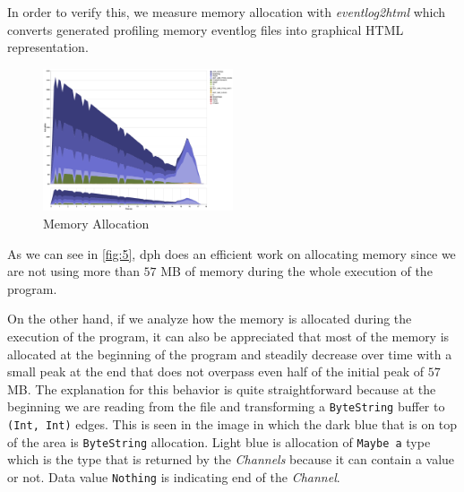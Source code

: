 \documentclass[preprint]{elsarticle}
\begin{document}
In order to verify this, we measure memory allocation with \textit{eventlog2html} \cite{eventlog2html} which converts generated profiling memory eventlog files into graphical HTML representation. 

\begin{figure}
  \begin{center}
     \includegraphics[width=0.5\textwidth] {visualization}
       \end{center}
     \caption{Memory Allocation}
     \label{fig:5}
 \end{figure}
 

As we can see in \autoref{fig:5}, \acrshort{dph} does an efficient work on allocating memory since we are not using more than $57$ MB of memory during the whole execution of the program.

On the other hand, if we analyze how the memory is allocated during the execution of the program, it can also be appreciated that most of the memory is allocated at the beginning of the program and steadily decrease over time with a small peak at the end that does not overpass even half of the initial peak of $57$ MB. The explanation for this behavior is quite straightforward because at the beginning we are reading from the file and transforming a \texttt{ByteString} buffer to \texttt{(Int, Int)} edges. This is seen in the image in which the dark blue that is on top of the area is \texttt{ByteString} allocation. Light blue is allocation of \texttt{Maybe a} type which is the type that is returned by the \textit{Channels} because it can contain a value or not. Data value \texttt{Nothing} is indicating end of the \textit{Channel}. 
\end{document}
